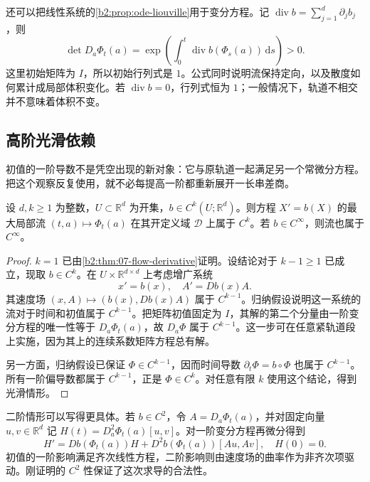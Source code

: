 \ProseParagraphBreak

还可以把线性系统的\cref{b2:prop:ode-liouville}用于变分方程。记 \(\operatorname{div}b=\sum_{j=1}^d\partial_j b_j\)，则
\[
 \det D_a\Phi_t(a)
 =\exp\left(\int_0^t\operatorname{div}b(\Phi_s(a))\,\mathrm ds\right)>0.
\]
这里初始矩阵为 \(I\)，所以初始行列式是 \(1\)。公式同时说明流保持定向，以及散度如何累计成局部体积变化。若 \(\operatorname{div}b=0\)，行列式恒为 \(1\)；一般情况下，轨道不相交并不意味着体积不变。

\subsection{高阶光滑依赖}
\label{b2:subsec:ode-higher-dependence}

初值的一阶导数不是凭空出现的新对象：它与原轨道一起满足另一个常微分方程。把这个观察反复使用，就不必每提高一阶都重新展开一长串差商。

\begin{theorem}[流的高阶光滑性]\label{b2:thm:ode-smooth-dependence}
设 \(d,k\geq1\) 为整数，\(U\subset\mathbb R^d\) 为开集，\(b\in C^k(U;\mathbb R^d)\)。则方程 \(X'=b(X)\) 的最大局部流 \((t,a)\mapsto\Phi_t(a)\) 在其开定义域 \(\mathcal D\) 上属于 \(C^k\)。若 \(b\in C^\infty\)，则流也属于 \(C^\infty\)。
\end{theorem}
\begin{proof}
\(k=1\) 已由\cref{b2:thm:07-flow-derivative}证明。设结论对于 \(k-1\geq1\) 已成立，现取 \(b\in C^k\)。在 \(U\times\mathbb R^{d\times d}\) 上考虑增广系统
\[
 x'=b(x),\quad A'=Db(x)A.
\]
其速度场 \((x,A)\mapsto(b(x),Db(x)A)\) 属于 \(C^{k-1}\)。归纳假设说明这一系统的流对于时间和初值属于 \(C^{k-1}\)。把矩阵初值固定为 \(I\)，其解的第二个分量由一阶变分方程的唯一性等于 \(D_a\Phi_t(a)\)，故 \(D_a\Phi\) 属于 \(C^{k-1}\)。这一步可在任意紧轨道段上实施，因为其上的连续系数矩阵方程总有解。

另一方面，归纳假设已保证 \(\Phi\in C^{k-1}\)，因而时间导数 \(\partial_t\Phi=b\circ\Phi\) 也属于 \(C^{k-1}\)。所有一阶偏导数都属于 \(C^{k-1}\)，正是 \(\Phi\in C^k\)。对任意有限 \(k\) 使用这个结论，得到光滑情形。
\end{proof}

二阶情形可以写得更具体。若 \(b\in C^2\)，令 \(A=D_a\Phi_t(a)\)，并对固定向量 \(u,v\in\mathbb R^d\) 记 \(H(t)=D_a^2\Phi_t(a)[u,v]\)。对一阶变分方程再微分得到
\[
 H'=Db(\Phi_t(a))H+D^2b(\Phi_t(a))[Au,Av],\quad H(0)=0.
\]
初值的一阶影响满足齐次线性方程，二阶影响则由速度场的曲率作为非齐次项驱动。刚证明的 \(C^2\) 性保证了这次求导的合法性。

